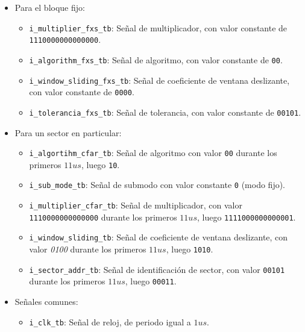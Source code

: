 \begin{itemize}
\item
Para el bloque fijo:
	\begin{itemize}
	\item
	\texttt{i\_multiplier\_fxs\_tb}: Señal de multiplicador, con valor constante de \texttt{1110000000000000}.
	
	\item
	\texttt{i\_algorithm\_fxs\_tb}: Señal de algoritmo, con valor constante de \texttt{00}.   
	
	\item  
	\texttt{i\_window\_sliding\_fxs\_tb}: Señal de coeficiente de ventana deslizante, con valor constante de \texttt{0000}.
	
	\item
	\texttt{i\_tolerancia\_fxs\_tb}: Señal de tolerancia, con valor constante de \texttt{00101}.    

	\end{itemize}

\item
Para un sector en particular:
	\begin{itemize}
  	\item
  	\texttt{i\_algortihm\_cfar\_tb}: Señal de algoritmo con valor \texttt{00} durante los primeros $11 us$, luego \texttt{10}.
  
  	\item
  	\texttt{i\_sub\_mode\_tb}: Señal de submodo con valor constante \texttt{0} (modo fijo).
  
  
  	\item
  	\texttt{i\_multiplier\_cfar\_tb}: Señal de multiplicador, con valor \texttt{1110000000000000} durante los primeros $11 us$, luego \texttt{1111000000000001}.
  
  	\item
  	\texttt{i\_window\_sliding\_tb}: Señal de coeficiente de ventana deslizante, con valor \textit{0100} durante los primeros $11 us$, luego \texttt{1010}.
  
  	\item
  	\texttt{i\_sector\_addr\_tb}: Señal de identificación de sector, con valor \texttt{00101} durante los primeros $11 us$, luego \texttt{00011}.
	\end{itemize}

\item
Señales comunes:
	\begin{itemize}
	\item
	\texttt{i\_clk\_tb}: Señal de reloj, de periodo igual a $1 us$.
	

\end{itemize}
\end{itemize}
